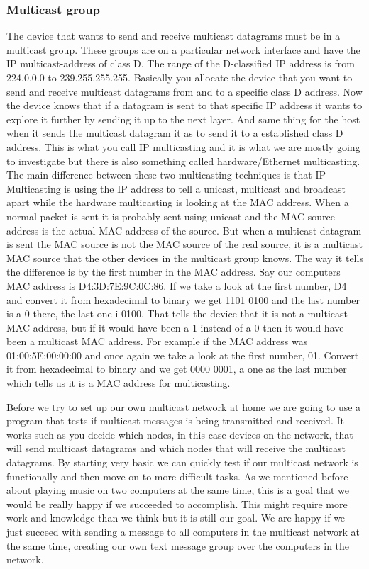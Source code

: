 \documentclass[9pt,a4paper]{acmproc}
\begin{document}
\subsubsection{Multicast group}

The device that wants to send and receive multicast datagrams must be in a multicast group. These groups are on a particular network interface and have the IP multicast-address of class D. The range of the D-classified IP address is from 224.0.0.0 to 239.255.255.255. Basically you allocate the device that you want to send and receive multicast datagrams from and to a specific class D address. Now the device knows that if a datagram is sent to that specific IP address it wants to explore it further by sending it up to the next layer. And same thing for the host when it sends the multicast datagram it as to send it to a established class D address. This is what you call IP multicasting and it is what we are mostly going to investigate but there is also something called hardware/Ethernet multicasting. The main difference between these two multicasting techniques is that IP Multicasting is using the IP address to tell a unicast, multicast and broadcast apart while the hardware multicasting is looking at the MAC address. When a normal packet is sent it is probably sent using unicast and the MAC source address is the actual MAC address of the source. But when a multicast datagram is sent the MAC source is not the MAC source of the real source, it is a multicast MAC source that the other devices in the multicast group knows. The way it tells the difference is by the first number in the MAC address. Say our computers MAC address is D4:3D:7E:9C:0C:86. If we take a look at the first number, D4 and convert it from hexadecimal to binary we get 1101 0100 and the last number is a 0 there, the last one i 0100. That tells the device that it is not a multicast MAC address, but if it would have been a 1 instead of a 0 then it would have been a multicast MAC address. For example if the MAC address was 01:00:5E:00:00:00 and once again we take a look at the first number, 01. Convert it from hexadecimal to binary and we get 0000 0001, a one as the last number which tells us it is a MAC address for multicasting.

Before we try to set up our own multicast network at home we are going to use a program that tests if multicast messages is being transmitted and received. It works such as you decide which nodes, in this case devices on the network, that will send multicast datagrams and which nodes that will receive the multicast datagrams. By starting very basic we can quickly test if our multicast network is functionally and then move on to more difficult tasks. As we mentioned before about playing music on two computers at the same time, this is a goal that we would be really happy if we succeeded to accomplish. This might require more work and knowledge than we think but it is still our goal. We are happy if we just succeed with sending a message to all computers in the multicast network at the same time, creating our own text message group over the computers in the network.
\end{document}

